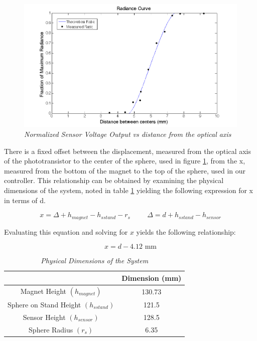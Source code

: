 \documentclass{article}
\theoremstyle{plain}
\theoremstyle{definition}
\theoremstyle{remark}
\begin{document}
\begin{figure}
\begin{center}
\includegraphics[width = 15cm]{SensorRadianceCurve.png}
\end{center}
\caption{\emph{Normalized Sensor Voltage Output vs distance from the optical axis}}
\label{Q1_d1}
\end{figure}

There is a fixed offset between the displacement, measured from the optical axis of the phototransistor to the center of the sphere, used in figure \ref{Q1_d1}, from the x, measured from the bottom of the magnet to the top of the sphere, used in our controller.  This relationship can be obtained by examining the physical dimensions of the system, noted in table \ref{Q1_dt2} yielding the following expression for x in terms of d.

$$ x = \Delta + h_{magnet} - h_{s stand} - r_{s} \hspace{1cm} \Delta = d + h_{s stand} - h_{sensor} $$

Evaluating this equation and solving for $x$ yields the following relationship:

$$ x = d - 4.12 \text{ mm} $$

\begin{table}
\begin{center}
    \begin{tabular}{|c|c|}
        \hline
        ~                                    & Dimension (mm) \\ \hline
        Magnet Height $(h_{magnet}) $          & 130.73         \\ 
        Sphere on Stand Height $(h_{s stand})$ & 121.5          \\ 
        Sensor Height $(h_{sensor})$           & 128.5          \\ 
        Sphere Radius $(r_{s})$                & 6.35           \\
        \hline
    \end{tabular}
\end{center}
\caption{\emph{Physical Dimensions of the System}}
\label{Q1_dt2}
\end{table}
\end{document}
